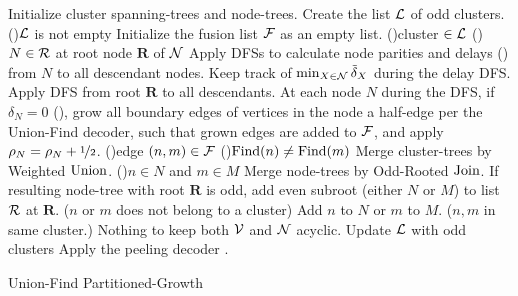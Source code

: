 \begin{algorithm}[h!]
  \BlankLine
  \BlankLine
  Initialize cluster spanning-trees and node-trees.\;\label{algo:B1a}%
  Create the list $\mathcal{L}$ of odd clusters.\;
  \While(){$\mathcal{L}$ is not empty}{
    Initialize the fusion list $\mathcal{F}$ as an empty list.\;\label{algo:B1b}
    \For(){cluster $\in\mathcal{L}$ \label{algo:B2a}}{
      \For(){$N \in\mathcal{R}$ at root node $\mathbf{R}$ of $\mathcal{N}$}{
        Apply DFSs to calculate node parities and delays () from $N$ to all descendant nodes. Keep track of $\min_{X \in \mathcal{N}}{\tilde{\delta}_X}$ during the delay DFS.\;\label{algo:pdc}
      }
      Apply DFS from root $\mathbf{R}$ to all descendants. At each node $N$ during the DFS, if $\delta_N=0$ (), grow all boundary edges of vertices in the node a half-edge per the Union-Find decoder, such that grown edges are added to $\mathcal{F}$, and apply $\rho_N=\rho_N +\nicefrac{1}{2}$. \;\label{algo:grow}
    }
    \For(){edge $(n,m) \in \mathcal{F}$\label{algo:B3a}}{
      \eIf(){$\operatorname{Find}(n)\neq\operatorname{Find}(m)$}{
        Merge cluster-trees by Weighted $\operatorname{Union}$.\;
        \eIf(){$n \in N$ and $m \in M$\label{algo:joina}}{
          Merge node-trees by Odd-Rooted $\operatorname{Join}$. If resulting node-tree with root $\mathbf{R}$ is odd, add even subroot (either $N$ or $M$) to list $\mathcal{R}$ at $\mathbf{R}$.\;
        }($n$ or $m$ does not belong to a cluster){
          Add $n$ to $N$ or $m$ to $M$.\;\label{algo:joinb}
        }
      }($n,m$ in same cluster.\label{algo:dfa}){
        Nothing to keep both $\mathcal{V}$ and $\mathcal{N}$ acyclic.\;\label{algo:dfb} 
      }
    }
    Update $\mathcal{L}$ with odd clusters\; \label{algo:B3b}
  }
  Apply the peeling decoder \cite{delfosse2017linear}.\label{algo:B4a}
  \caption{Union-Find Partitioned-Growth}\label{algo:ufbb}
\end{algorithm}